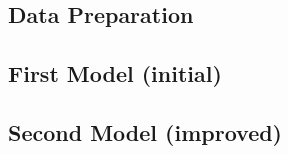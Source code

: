\subsection{Data Preparation}


\subsection{First Model (initial)}


\subsection{Second Model (improved)}


